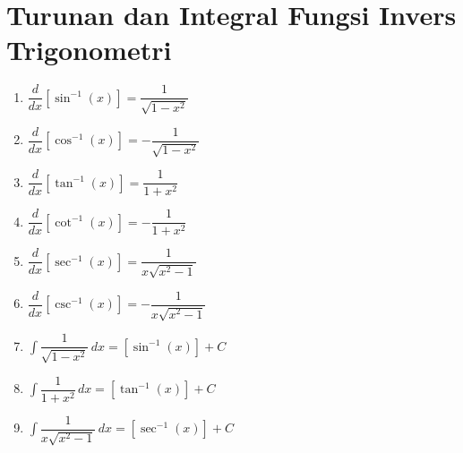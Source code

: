 \documentclass{article}
\begin{document}
\section*{Turunan dan Integral Fungsi Invers Trigonometri}
\begin{multicols}{2}
\begin{enumerate}
	\item $\dfrac{d}{dx} [\sin^{-1}(x)] = \dfrac{1}{\sqrt{1-x^2}}$
	\item $\dfrac{d}{dx} [\cos^{-1}(x)] = -\dfrac{1}{\sqrt{1-x^2}}$
	\item $\dfrac{d}{dx} [\tan^{-1}(x)] = \dfrac{1}{1+x^2}$
	\item $\dfrac{d}{dx} [\cot^{-1}(x)] = -\dfrac{1}{1+x^2}$
	\item $\dfrac{d}{dx} [\sec^{-1}(x)] = \dfrac{1}{x\sqrt{x^2-1}}$
	\item $\dfrac{d}{dx} [\csc^{-1}(x)] = -\dfrac{1}{x\sqrt{x^2-1}}$
	\item $\displaystyle \int \dfrac{1}{\sqrt{1-x^2}}\, dx = [\sin^{-1}(x)]+ C$  
	\item $\displaystyle \int \dfrac{1}{1+x^2}\, dx = [\tan^{-1}(x)]+ C$  
	\item $\displaystyle \int \dfrac{1}{x\sqrt{x^2-1}}\, dx = [\sec^{-1}(x)]+ C$  
\end{enumerate}
\end{multicols}
\end{document}
